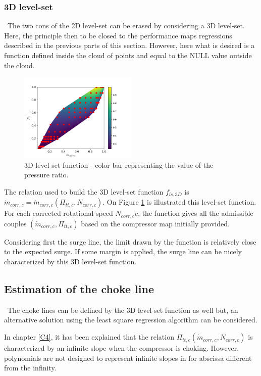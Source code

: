 \subsubsection{3D level-set}
\quad\ The two cons of the 2D level-set can be erased by considering a 3D level-set. Here, the principle then to be closed to the performance maps regressions described in the previous parts of this section. However, here what is desired is a function defined inside the cloud of points and equal to the NULL value outside the cloud. 



\begin{figure}[H]
    \centering
    \includegraphics[width=0.5\textwidth]{Comp_map/3D_LS.png}
    \caption{3D level-set function - color bar representing the value of the pressure ratio.}
    \label{fig:C7_LS3D}
\end{figure}
The relation used to build the 3D level-set function $f_{ls,3D}$ is $\dot{m}_{corr,c} = \dot{m}_{corr,c}(\Pi_{tt,c},N_{corr,c})$. On Figure \ref{fig:C7_LS3D} is illustrated this level-set function. 
For each corrected rotational speed $N_{corr,c}c$, the function gives all the admissible couples $(\dot{m}_{corr,c},\Pi_{tt,c})$ based on the compressor map initially provided. 

Considering first the surge line, the limit drawn by the function is relatively close to the expected surge. If some margin is applied, the surge line can be nicely characterized by this 3D level-set function. 

\subsection{Estimation of the choke line}
\quad\ The choke lines can be defined by the 3D level-set function as well but, an alternative solution using the least square regression algorithm can be considered.


In chapter \ref{C4}, it has been explained that the relation $\Pi_{tt,c}(\dot{m}_{corr,c},N_{corr,c})$ is characterized by an infinite slope when the compressor is choking. However, polynomials are not designed to represent infinite slopes in for abscissa different from the infinity.

